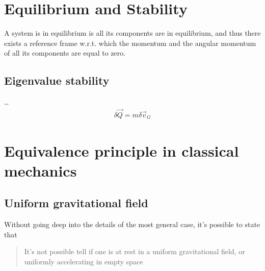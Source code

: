 \documentclass[letterpaper,10pt,english]{jupyterBook}
\begin{document}
\sphinxstepscope


\section{Equilibrium and Stability}
\label{\detokenize{ch/dynamics-equilibrium-stability:equilibrium-and-stability}}\label{\detokenize{ch/dynamics-equilibrium-stability:classical-mechanics-dynamics-equilibrium-and-stability}}\label{\detokenize{ch/dynamics-equilibrium-stability::doc}}
\sphinxAtStartPar
A system is in equilibrium is all its components are in equilibrium, and thus there exists a reference frame w.r.t. which the momentum and the angular momentum of all its components are equal to zero.


\subsection{Eigenvalue stability}
\label{\detokenize{ch/dynamics-equilibrium-stability:eigenvalue-stability}}
\sphinxAtStartPar
…
\begin{equation*}
\begin{split}\delta \vec{Q} = m \delta \vec{v}_G\end{split}
\end{equation*}

\subsection{}
\label{\detokenize{ch/dynamics-equilibrium-stability:id1}}
\sphinxstepscope


\section{Equivalence principle in classical mechanics}
\label{\detokenize{ch/dynamics-equivalence-principle:equivalence-principle-in-classical-mechanics}}\label{\detokenize{ch/dynamics-equivalence-principle:classical-mechanics-dynamics-equivalence-principle}}\label{\detokenize{ch/dynamics-equivalence-principle::doc}}

\subsection{Uniform gravitational field}
\label{\detokenize{ch/dynamics-equivalence-principle:uniform-gravitational-field}}\label{\detokenize{ch/dynamics-equivalence-principle:classical-mechanics-dynamics-equivalence-principle-uniform}}
\sphinxAtStartPar
Without going deep into the details of the most general case, it’s possible to state that
\begin{quote}

\sphinxAtStartPar
It’s not possible tell if one is at rest in a uniform gravitational field, or uniformly accelerating in empty space
\end{quote}
\end{document}
